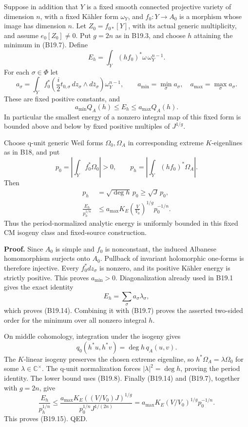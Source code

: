 Suppose in addition that \(Y\) is a fixed smooth connected projective variety of dimension \(n\), with a fixed Kähler form \(\omega_Y\), and \(f_0:Y\to A_0\) is a morphism whose image has dimension \(n\). Let \(Z_0=f_{0*}[Y]\), with its actual generic multiplicity, and assume \(e_0[Z_0]\ne0\). Put \(g=2n\) as in B19.3, and choose \(h\) attaining the minimum in (B19.7). Define \[
 E_h=\int_Y(hf_0)^*\omega\,\omega_Y^{n-1}.
\] For each \(\sigma\in\Phi\) let \[
 a_\sigma=\int_Yf_0^*\left(\frac i2t_{0,\sigma}\,dz_\sigma\wedge d\bar z_\sigma\right)
                  \omega_Y^{n-1},\qquad
 a_{\min}=\min_\sigma a_\sigma,\quad a_{\max}=\max_\sigma a_\sigma.
\] These are fixed positive constants, and \[
 a_{\min}Q_A(h)\le E_h\le a_{\max}Q_A(h).
\tag{B19.14}
\] In particular the smallest energy of a nonzero integral map of this fixed form is bounded above and below by fixed positive multiples of \(J^{1/g}\).

Choose q-unit generic Weil forms \(\Omega_0,\Omega_A\) in corresponding extreme \(K\)-eigenlines as in B18, and put \[
 p_0=\left|\int_Yf_0^*\Omega_0\right|>0,\qquad
 p_h=\left|\int_Y(hf_0)^*\Omega_A\right|.
\] Then \[
 \begin{aligned}
 p_h&=\sqrt{\deg h}\,p_0\ge\sqrt J\,p_0,\\
 \frac{E_h}{p_h^{1/n}}
 &\le a_{\max}K_E\left(\frac{V}{V_0}\right)^{1/g}p_0^{-1/n}.
 \end{aligned}
\tag{B19.15}
\] Thus the period-normalized analytic energy is uniformly bounded in this fixed CM isogeny class and fixed-source construction.

\textbf{Proof.} Since \(A_0\) is simple and \(f_0\) is nonconstant, the induced Albanese homomorphism surjects onto \(A_0\). Pullback of invariant holomorphic one-forms is therefore injective. Every \(f_0^*dz_\sigma\) is nonzero, and its positive Kähler energy is strictly positive. This proves \(a_{\min}>0\). Diagonalization already used in B19.1 gives the exact identity \[
 E_h=\sum_\sigma a_\sigma\lambda_\sigma,
\] which proves (B19.14). Combining it with (B19.7) proves the asserted two-sided order for the minimum over all nonzero integral \(h\).

On middle cohomology, integration under the isogeny gives \[
 q_0(h^*u,h^*v)=\deg h\,q_A(u,v).
\] The \(K\)-linear isogeny preserves the chosen extreme eigenline, so \(h^*\Omega_A=\lambda\Omega_0\) for some \(\lambda\in\mathbb C^\times\). The q-unit normalization forces \(|\lambda|^2=\deg h\), proving the period identity. The lower bound uses (B19.8). Finally (B19.14) and (B19.7), together with \(g=2n\), give \[
 \frac{E_h}{p_h^{1/n}}
 \le\frac{a_{\max}K_E((V/V_0)J)^{1/g}}
          {p_0^{1/n}J^{1/(2n)}}
 =a_{\max}K_E(V/V_0)^{1/g}p_0^{-1/n}.
\] This proves (B19.15). QED.

